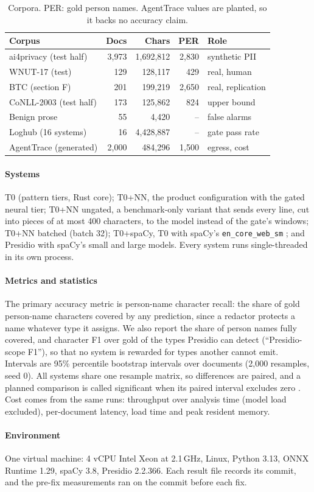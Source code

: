 \begin{table}[t]
\caption{Corpora. PER: gold person names. AgentTrace values are planted, so it backs no accuracy claim.}\label{tab:corpora}
\centering\footnotesize\setlength{\tabcolsep}{3pt}
\begin{tabular}{@{}l r r r l@{}}
\toprule
Corpus & Docs & Chars & PER & Role \\
\midrule
ai4privacy (test half) & 3,973 & 1,692,812 & 2,830 & synthetic PII \\
WNUT-17 (test) & 129 & 128,117 & 429 & real, human \\
BTC (section F) & 201 & 199,219 & 2,650 & real, replication \\
CoNLL-2003 (test half) & 173 & 125,862 & 824 & upper bound \\
Benign prose & 55 & 4,420 & -- & false alarms \\
Loghub (16 systems) & 16 & 4,428,887 & -- & gate pass rate \\
AgentTrace (generated) & 2,000 & 484,296 & 1,500 & egress, cost \\
\bottomrule
\end{tabular}
\end{table}

\paragraph{Systems} T0 (pattern tiers, Rust core); T0+NN, the product configuration with the gated neural tier; T0+NN ungated, a benchmark-only variant that sends every line, cut into pieces of at most 400 characters, to the model instead of the gate's windows; T0+NN batched (batch 32); T0+spaCy, T0 with spaCy's \texttt{en\_core\_web\_sm} \cite{honnibal2020spacy}; and Presidio \cite{presidio} with spaCy's small and large models. Every system runs single-threaded in its own process.

\paragraph{Metrics and statistics} The primary accuracy metric is person-name character recall: the share of gold person-name characters covered by any prediction, since a redactor protects a name whatever type it assigns. We also report the share of person names fully covered, and character F1 over gold of the types Presidio can detect (``Presidio-scope F1''), so that no system is rewarded for types another cannot emit. Intervals are 95\% percentile bootstrap intervals over documents (2,000 resamples, seed 0). All systems share one resample matrix, so differences are paired, and a planned comparison is called significant when its paired interval excludes zero \cite{efron1993bootstrap}. Cost comes from the same runs: throughput over analysis time (model load excluded), per-document latency, load time and peak resident memory.

\paragraph{Environment} One virtual machine: 4 vCPU Intel Xeon at 2.1\,GHz, Linux, Python 3.13, ONNX Runtime 1.29, spaCy 3.8, Presidio 2.2.366. Each result file records its commit, and the pre-fix measurements ran on the commit before each fix.

